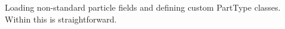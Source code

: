 \label{fig:custom_ptype}
Loading non-standard particle fields and defining custom PartType classes. Within  this is straightforward.